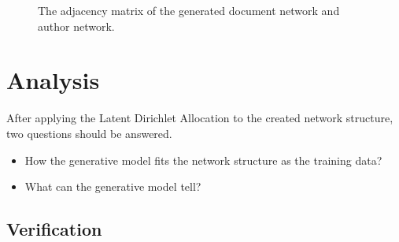 \documentclass[letterpaper]{article}
\begin{document}
\begin{figure}
\caption{The adjacency matrix of the generated document network and author network.}
\label{fig:gene_ad_mat}
\end{figure}

\section{Analysis}

After applying the Latent Dirichlet Allocation to the created network structure, two questions should be answered.
\begin{itemize}
\item How the generative model fits the network structure as the training data?
\item What can the generative model tell?
\end{itemize}

\subsection{Verification}
\end{document}
